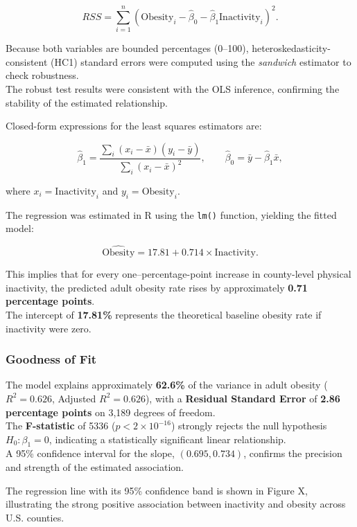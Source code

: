 \documentclass[
  letterpaper,
  DIV=11,
  numbers=noendperiod]{scrartcl}
\begin{document}
\[
RSS = \sum_{i=1}^{n}(\text{Obesity}_i - \hat{\beta}_0 - \hat{\beta}_1\text{Inactivity}_i)^2.
\]

Because both variables are bounded percentages (0--100),
heteroskedasticity-consistent (HC1) standard errors were computed using
the \emph{sandwich} estimator to check robustness.\\
The robust test results were consistent with the OLS inference,
confirming the stability of the estimated relationship.

Closed-form expressions for the least squares estimators are:

\[
\hat{\beta}_1 = \frac{\sum_i(x_i - \bar{x})(y_i - \bar{y})}{\sum_i(x_i - \bar{x})^2}, \qquad
\hat{\beta}_0 = \bar{y} - \hat{\beta}_1\bar{x},
\]

where \(x_i = \text{Inactivity}_i\) and \(y_i = \text{Obesity}_i\).

The regression was estimated in R using the \texttt{lm()} function,
yielding the fitted model:

\[
\widehat{\text{Obesity}} = 17.81 + 0.714 \times \text{Inactivity}.
\]

This implies that for every one--percentage-point increase in
county-level physical inactivity, the predicted adult obesity rate rises
by approximately \textbf{0.71 percentage points}.\\
The intercept of \textbf{17.81\%} represents the theoretical baseline
obesity rate if inactivity were zero.

\subsubsection{Goodness of Fit}\label{goodness-of-fit}

The model explains approximately \textbf{62.6\%} of the variance in
adult obesity (\(R^2 = 0.626\), Adjusted \(R^2 = 0.626\)), with a
\textbf{Residual Standard Error} of \textbf{2.86 percentage points} on
3,189 degrees of freedom.\\
The \textbf{F-statistic} of 5336 (\(p < 2 \times 10^{-16}\)) strongly
rejects the null hypothesis \(H_0: \beta_1 = 0\), indicating a
statistically significant linear relationship.\\
A 95\% confidence interval for the slope, \((0.695, 0.734)\), confirms
the precision and strength of the estimated association.

The regression line with its 95\% confidence band is shown in Figure X,
illustrating the strong positive association between inactivity and
obesity across U.S. counties.
\end{document}
